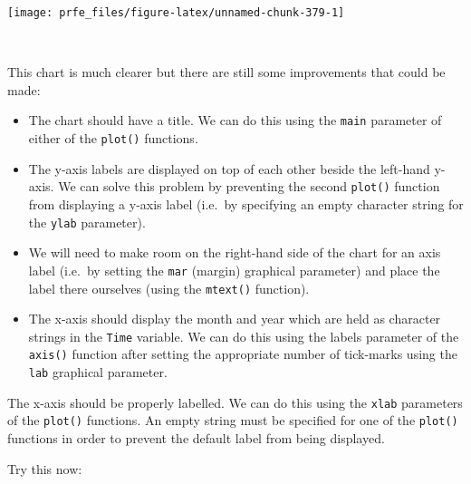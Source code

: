 \documentclass[
  12pt,
  a4paper]{book}
\begin{document}
\begin{center}\texttt{[image: prfe\_files/figure-latex/unnamed-chunk-379-1]} \end{center}

~

This chart is much clearer but there are still some improvements that could be made:

\begin{itemize}
\item
  The chart should have a title. We can do this using the \texttt{main} parameter of either of the \texttt{plot()} functions.
\item
  The y-axis labels are displayed on top of each other beside the left-hand y-axis. We can solve this problem by preventing the second \texttt{plot()} function from displaying a y-axis label (i.e.~by specifying an empty character string for the \texttt{ylab} parameter).
\item
  We will need to make room on the right-hand side of the chart for an axis label (i.e.~by setting the \texttt{mar} (margin) graphical parameter) and place the label there ourselves (using the \texttt{mtext()} function).
\item
  The x-axis should display the month and year which are held as character strings in the \texttt{Time} variable. We can do this using the labels parameter of the \texttt{axis()} function after setting the appropriate number of tick-marks using the \texttt{lab} graphical parameter.
\end{itemize}

The x-axis should be properly labelled. We can do this using the \texttt{xlab} parameters of the \texttt{plot()} functions. An empty string must be specified for one of the \texttt{plot()} functions in order to prevent the default label from being displayed.

Try this now:

~
\end{document}
